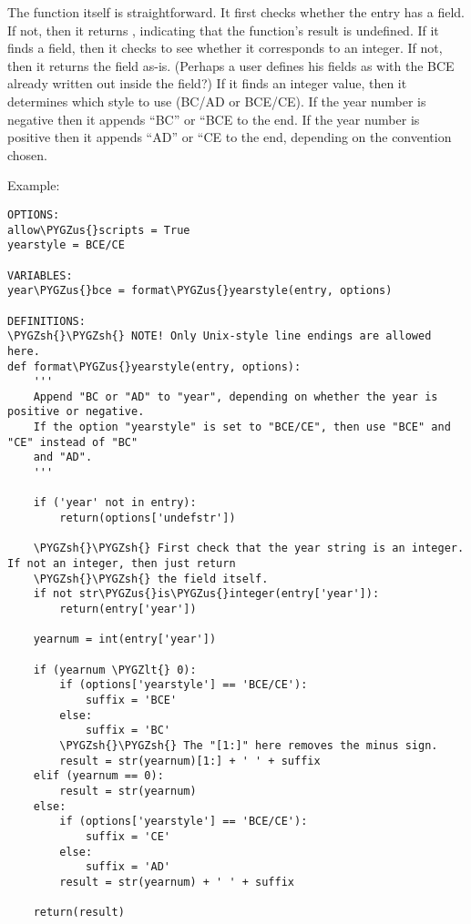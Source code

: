 \documentclass[letterpaper,10pt,english]{sphinxmanual}
\def\PYGZus{\char`\_}
\def\PYGZlt{\char`\<}
\def\PYGZsh{\char`\#}
\begin{document}
The  function itself is straightforward. It first checks whether the entry has a  field. If not, then it returns , indicating that the function's result is undefined. If it finds a  field, then it checks to see whether it corresponds to an integer. If not, then it returns the field as-is. (Perhaps a user defines his  fields as  with the BCE already written out inside the field?) If it finds an integer value, then it determines which style to use (BC/AD or BCE/CE). If the year number is negative then it appends ``BC'' or ``BCE to the end. If the year number is positive then it appends ``AD'' or ``CE to the end, depending on the convention chosen.

Example:

\begin{Verbatim}[commandchars=\\\{\}]
OPTIONS:
allow\PYGZus{}scripts = True
yearstyle = BCE/CE

VARIABLES:
year\PYGZus{}bce = format\PYGZus{}yearstyle(entry, options)

DEFINITIONS:
\PYGZsh{}\PYGZsh{} NOTE! Only Unix-style line endings are allowed here.
def format\PYGZus{}yearstyle(entry, options):
    '''
    Append "BC or "AD" to "year", depending on whether the year is positive or negative.
    If the option "yearstyle" is set to "BCE/CE", then use "BCE" and "CE" instead of "BC"
    and "AD".
    '''

    if ('year' not in entry):
        return(options['undefstr'])

    \PYGZsh{}\PYGZsh{} First check that the year string is an integer. If not an integer, then just return
    \PYGZsh{}\PYGZsh{} the field itself.
    if not str\PYGZus{}is\PYGZus{}integer(entry['year']):
        return(entry['year'])

    yearnum = int(entry['year'])

    if (yearnum \PYGZlt{} 0):
        if (options['yearstyle'] == 'BCE/CE'):
            suffix = 'BCE'
        else:
            suffix = 'BC'
        \PYGZsh{}\PYGZsh{} The "[1:]" here removes the minus sign.
        result = str(yearnum)[1:] + ' ' + suffix
    elif (yearnum == 0):
        result = str(yearnum)
    else:
        if (options['yearstyle'] == 'BCE/CE'):
            suffix = 'CE'
        else:
            suffix = 'AD'
        result = str(yearnum) + ' ' + suffix

    return(result)
\end{Verbatim}
\end{document}
